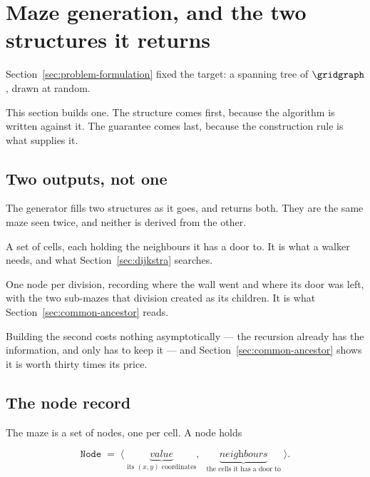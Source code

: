 \section{Maze generation, and the two structures it returns}
\label{sec:maze-generation}

Section~\ref{sec:problem-formulation} fixed the target: a spanning tree of
$\gridgraph$, drawn at random.

This section builds one. The structure comes first, because the algorithm is
written against it. The guarantee comes last, because the construction rule is
what supplies it.

\subsection{Two outputs, not one}

The generator fills two structures as it goes, and returns both. They are the
same maze seen twice, and neither is derived from the other.

\begin{description}[leftmargin=*,style=nextline,itemsep=6pt]
  \item[The \keyterm{graph}: which doors exist.] A set of cells, each holding
    the neighbours it has a door to. It is what a walker needs, and what
    Section~\ref{sec:dijkstra} searches.
  \item[The \keyterm{binary tree}: how it was built.] One node per division,
    recording where the wall went and where its door was left, with the two
    sub-mazes that division created as its children. It is what
    Section~\ref{sec:common-ancestor} reads.
\end{description}

Building the second costs nothing asymptotically --- the recursion already has
the information, and only has to keep it --- and
Section~\ref{sec:common-ancestor} shows it is worth thirty times its price.

\subsection{The node record}

The maze is a set of nodes, one per cell. A node holds

\[
  \texttt{Node} \;=\; \bigl\langle\;
    \underbrace{\textit{value}}_{\text{its }(x,y)\text{ coordinates}},\;\;
    \underbrace{\textit{neighbours}}_{\text{the cells it has a door to}}
  \;\bigr\rangle .
\]

